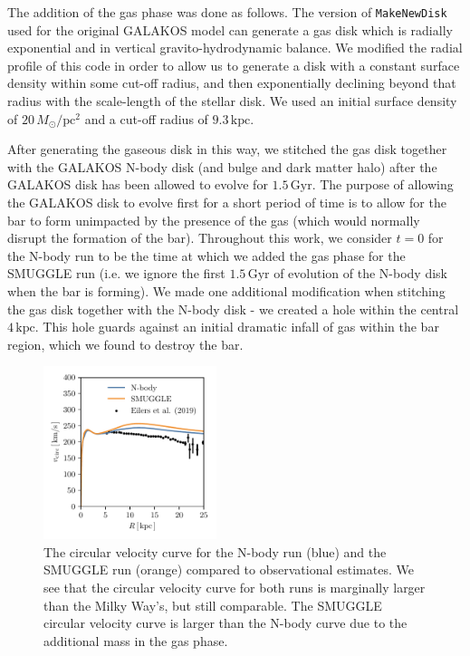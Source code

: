 \documentclass{natureprintstyle}
\begin{document}
The addition of the gas phase was done as follows. The version of
\texttt{MakeNewDisk} used for the original GALAKOS model can generate a gas
disk which is radially exponential and in vertical gravito-hydrodynamic
balance. We modified the radial profile of this code in order to allow us to
generate a disk with a constant surface density within some cut-off radius,
and then exponentially declining beyond that radius with the scale-length of
the stellar disk. We used an initial surface density of
$20\,M_{\odot}/\textrm{pc}^2$ and a cut-off radius of $9.3\,\textrm{kpc}$.

After generating the gaseous disk in this way, we stitched the gas disk
together with the GALAKOS N-body disk (and bulge and dark matter halo) after
the GALAKOS disk has been allowed to evolve for $1.5\,\textrm{Gyr}$. The
purpose of allowing the GALAKOS disk to evolve first for a short period of
time is to allow for the bar to form unimpacted by the presence of the gas
(which would normally disrupt the formation of the bar). Throughout this work,
we consider $t=0$ for the N-body run to be the time at which we added the gas
phase for the SMUGGLE run (i.e. we ignore the first $1.5\,\textrm{Gyr}$ of
evolution of the N-body disk when the bar is forming). We made one additional
modification when stitching the gas disk together with the N-body disk - we
created a hole within the central $4\,\textrm{kpc}$. This hole guards
against an initial dramatic infall of gas within the bar region, which we
found to destroy the bar.

\begin{figure}[t]%
\centering
\includegraphics[width=0.45\textwidth]{fig/fig-vcirc.pdf}
\caption{The circular velocity curve for the N-body run (blue) and the SMUGGLE
run (orange) compared to observational estimates.\cite{2019ApJ...871..120E} We
see that the circular velocity curve for both runs is marginally larger than
the Milky Way's, but still comparable. The SMUGGLE circular velocity curve is
larger than the N-body curve due to the additional mass in the gas phase.}
\label{fig:vcirc}
\end{figure}
\end{document}
